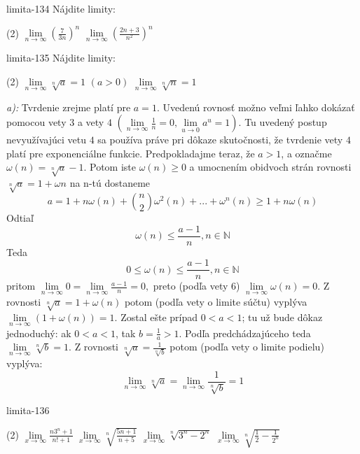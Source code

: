 \begin{defproblem}{limita-134}
Nájdite limity:
\begin{tasks}(2)
\task $\lim\limits_{n \rightarrow \infty} (\frac{7}{3n})^n$
\task $\lim\limits_{n \rightarrow \infty} (\frac{2n+3}{n^2})^n$
\end{tasks}
\end{defproblem}

\begin{defproblem}{limita-135}
Nájdite limity:
\begin{tasks}(2)
\task $\lim\limits_{n \rightarrow \infty} \sqrt[n]{a}=1$  $(a>0)$
\task $\lim\limits_{n \rightarrow \infty} \sqrt[n]{n}=1$
\end{tasks}

\begin{solution}
    \textit{a):}
    Tvrdenie zrejme platí pre $a=1$. Uvedenú rovnosť možno veľmi ľahko dokázať
    pomocou vety $3$ a vety $4$ $(\lim\limits_{n \rightarrow \infty}
    \frac{1}{n}=0, \lim\limits_{u \rightarrow 0} a^u=1)$. Tu uvedený postup
    nevyužívajúci vetu $4$ sa používa práve pri dôkaze skutočnosti, že tvrdenie
    vety $4$ platí pre exponenciálne funkcie. Predpokladajme teraz, že $a>1$, a
    označme $\omega (n)=\sqrt[n]{a}-1$. Potom iste $\omega (n)\geq 0$ a
    umocnením obidvoch strán rovnosti $\sqrt[n]{a}=1+\omega n$ na n-tú dostaneme
    \[
        a = 1 + n \omega(n) + {n \choose 2}\omega^2 (n) + ...
            + \omega^n (n)\geq 1+n\omega(n)
    \]
    Odtiaľ
    \[
        \omega (n) \leq \frac{a-1}{n}, n\in \mathbb{N}
    \]
    Teda
    \[
        0\leq \omega (n) \leq \frac{a-1}{n}, n \in \mathbb{N}
    \]
    pritom $\lim\limits_{n \rightarrow \infty} 0=\lim\limits_{n \rightarrow
    \infty} \frac{a-1}{n}=0,$ preto (podľa vety $6$) $\lim\limits_{n \rightarrow
    \infty}\omega (n)=0.$ Z rovnosti $\sqrt[n]{a}=1+\omega (n)$ potom (podľa
    vety o limite súčtu) vyplýva $\lim\limits_{n \rightarrow \infty} (1+\omega
    (n))=1$. Zostal ešte prípad $0<a<1$; tu už bude dôkaz jednoduchý: ak
    $0<a<1$, tak $b=\frac{1}{a}>1$. Podľa predchádzajúceho teda $\lim\limits_{n
    \rightarrow \infty} \sqrt[n]{b}=1$. Z rovnosti
    $\sqrt[n]{a}=\frac{1}{\sqrt[n]{b}}$ potom (podľa vety o limite podielu)
    vyplýva:
    \[
        \lim\limits_{n \rightarrow \infty} \sqrt[n]{a}
            = \lim\limits_{n \rightarrow \infty} \frac{1}{\sqrt[n]{b}}
            = 1
    \]
\end{solution}
\end{defproblem}

\begin{defproblem}{limita-136}
\begin{tasks}(2)
    \task $\lim\limits_{{x \rightarrow \infty}} \frac{n 3^n+1}{n!+1}$
    \task $\lim\limits_{{x \rightarrow \infty}} \sqrt[n]{\frac{5n+1}{n+5}}$
    \task $\lim\limits_{{x \rightarrow \infty}} \sqrt[n]{3^n-2^n}$
    \task $\lim\limits_{{x \rightarrow \infty}} \sqrt[n]{\frac{1}{2}-\frac{1}{2^n}}$
\end{tasks}
\end{defproblem}

